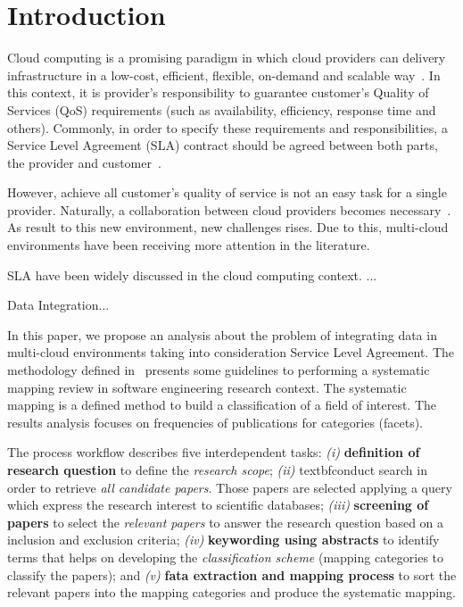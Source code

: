 \section{Introduction}
\label{sec:intro}


Cloud computing is a promising paradigm in which cloud providers can delivery infrastructure in 
a low-cost, efficient, flexible, on-demand and scalable way~\cite{014}.
In this context, it is provider's responsibility to guarantee customer's Quality
of Services (QoS) requirements (such as availability, efficiency, response time
and others).
Commonly, in order to specify these requirements and responsibilities, a Service
Level Agreement (SLA) contract should be agreed between both parts, the provider and customer~\cite{011}.

However, achieve all customer's quality of service is not an easy task for a single provider.
Naturally, a collaboration between cloud providers becomes necessary~\cite{036}.
As result to this new environment, new challenges rises.
Due to this, multi-cloud environments have been receiving more attention in the literature.

SLA have been widely discussed in the cloud computing context. ...

Data Integration...

In this paper, we propose an analysis about the problem of integrating data in multi-cloud environments taking into consideration Service Level Agreement. 
The methodology defined in~\cite{SM:Petersen:2008} presents some guidelines to
performing a systematic mapping review in software engineering research
context. The systematic mapping is a defined method to build
a classification of a field of interest. The results analysis focuses on
frequencies of publications for categories (facets).  

The process workflow describes five interdependent tasks: \textit{(i)}
\textbf{definition of research question} to define the \textit{research scope}; \textit{(ii)} textbf{conduct search} in order to retrieve \textit{all candidate papers}. Those papers are selected applying a query which
express the research interest to scientific databases; \textit{(iii)}
\textbf{screening of papers} to select the \textit{relevant papers} to answer the research
question based on a inclusion and exclusion criteria; \textit{(iv)}
\textbf{keywording using abstracts} to identify terms that helps on developing the
\textit{classification scheme} (mapping categories to classify the papers); and
\textit{(v)} \textbf{fata extraction and mapping process} to sort the relevant
papers into the mapping categories and produce the systematic mapping.


